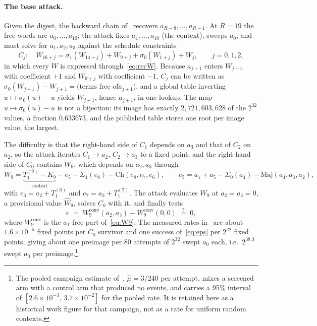 \documentclass[11pt,a4paper]{article}
\newcommand{\Sig}[1]{\Sigma_{#1}}
\newcommand{\sig}[1]{\sigma_{#1}}
\newcommand{\Maj}{\mathrm{Maj}}
\newcommand{\Ch}{\mathrm{Ch}}
\begin{document}
\paragraph{The base attack.}
Given the digest, the backward chain of~\cite{Basra2026R19} recovers
$a_{R-8},\dots,a_{R-1}$.  At $R=19$ the free words are $a_0,\dots,a_{10}$; the
attack fixes $a_4,\dots,a_{10}$ (the context), sweeps $a_0$, and must solve for
$a_1,a_2,a_3$ against the schedule constraints
\begin{equation}
C_j:\quad W_{16+j} = \sig1(W_{14+j}) + W_{9+j} + \sig0(W_{1+j}) + W_j,\qquad j=0,1,2,
\label{eq:Cj}
\end{equation}
in which every $W$ is expressed through~\eqref{eq:recW}.  Because $a_{j+1}$
enters $W_{j+1}$ with coefficient $+1$ and $W_{9+j}$ with coefficient $-1$,
$C_j$ can be written as $\sig0(W_{j+1})-W_{j+1}=\text{(terms free of
}a_{j+1})$, and a global table inverting $u\mapsto\sig0(u)-u$ yields
$W_{j+1}$, hence $a_{j+1}$, in one lookup.  The map $u\mapsto\sig0(u)-u$ is
not a bijection: its image has exactly $2{,}721{,}603{,}628$ of the $2^{32}$
values, a fraction $0.633673$, and the published table stores one root per
image value, the largest.

The difficulty is that the right-hand side of $C_1$ depends on $a_3$ and that
of $C_2$ on $a_2$, so the attack iterates $C_1\to a_2$, $C_2\to a_3$ to a fixed
point; and the right-hand side of $C_0$ contains $W_9$, which depends on
$a_2,a_3$ through
\begin{equation}
W_9 = \underbrace{T_1^{(9)}-K_9}_{\text{context}}
      - e_5 - \Sig1(e_8) - \Ch(e_8,e_7,e_6),\qquad
e_5 = a_1 + a_5 - \Sig0(a_4) - \Maj(a_4,a_3,a_2),
\label{eq:W9}
\end{equation}
with $e_6=a_2+T_1^{(6)}$ and $e_7=a_3+T_1^{(7)}$.  The attack evaluates $W_9$
at $a_2=a_3=0$, a provisional value $\hat W_9$, solves $C_0$ with it, and
finally tests
\begin{equation}
\varepsilon \;=\; W_9^{\mathrm{conv}}(a_2,a_3) - W_9^{\mathrm{conv}}(0,0)
\;\stackrel{?}{=}\; 0,
\label{eq:eps}
\end{equation}
where $W_9^{\mathrm{conv}}$ is the $a_1$-free part of~\eqref{eq:W9}.  The
measured rates in~\cite{Basra2026R19} are about $1.6\times10^{-5}$ fixed
points per $C_0$ survivor and one success of~\eqref{eq:eps} per $2^{22}$
fixed points, giving about one preimage per 80 attempts of $2^{32}$ swept
$a_0$ each, i.e.\ $2^{38.3}$ swept $a_0$ per preimage.\footnote{The pooled campaign estimate of~\cite{Basra2026R19},
$\hat\mu=3/240$ per attempt, mixes a screened arm with a control arm that
produced no events, and carries a 95\% interval of
$[2.6\times10^{-3},\,3.7\times10^{-2}]$ for the pooled rate.  It is retained
here as a historical work figure for that campaign, not as a rate for uniform
random contexts.}
\end{document}
